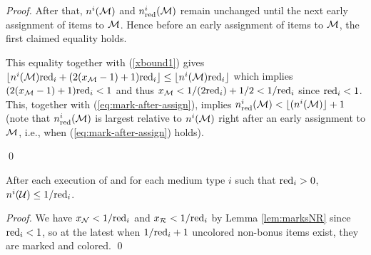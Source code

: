 \begin{proof}
After that, $\allitems(\M)$ and $\reditems(\M)$ remain unchanged until the next early assignment of items to $\mathcal{M}$. Hence before an early assignment of items to $\mathcal{M}$, the first claimed equality holds.

This equality together with (\ref{xbound1}) 
gives $\lfloor n^i(\mathcal{M})\mathrm{red}_i + (2(x_{\mathcal{M}}-1)+1)\mathrm{red}_i \rfloor \le \lfloor n^i(\mathcal{M})\mathrm{red}_i \rfloor$
which implies $(2(x_{\mathcal{M}}-1)+1)\mathrm{red}_i<1$ and thus $x_{\mathcal{M}} < 1/(2\mathrm{red}_i)+1/2 < 1/\mathrm{red}_i$ since $\mathrm{red}_i<1$.
This, together with (\ref{eq:mark-after-assign}), implies $n_{\mathrm{red}}^i(\mathcal{M})<\lfloor (n^i(\mathcal{M}) \rfloor +1$ (note that $\reditems(\M)$ is largest relative to $\allitems(\M)$ right after an early assignment to $\mathcal{M}$, i.e., when (\ref{eq:mark-after-assign}) holds).
\iffalse
It furthermore follows from (\ref{xbound2}) that after any early assignment
has taken place and the $x_\M$ bins with one blue item have received their
second blue item, we have 
\begin{equation}
\allitems(\M)\redfrac_i < \reditems(\M) +2\redfrac_i \label{lem1:before-assignment}
\end{equation}
since by this time $\allitems(\M)$ has increased by $2x_\M+1$ and
$\reditems(\M)$ has increased by 1 compared to the situation in (\ref{xbound2}).
This also holds before the first early assignment takes place.
By definition of $\blue_\M$, we have $(\allitems(\M)+2\blue_\M+1)\redfrac_i \ge \reditems(\M)+1$. This, together with (\ref{lem1:before-assignment}), implies
$(2\blue_\M+1)\redfrac_i > 1-2\redfrac_i$ and thus $\blue_\M > 1/(2\redfrac_i)-3/2$.
\fi 
\qed\end{proof}

\iffalse 
\begin{corollary}
	\label{cor}
	For a medium type $i$ with $\redfrac_i>0$, let $x_i = \max\{a\in\mathbb N| a <  1/(2\redfrac_i)+1/2 \}.$
	Then $\blue_\N\in\{x_i,x_i-1\}$ in all iterations of Algorithm \ref{alg:mark} for type $i$.
\end{corollary}
\begin{proof}
	By Lemma \ref{lem:marksNR}, $\blue_\N$ is strictly contained in an open interval of length 2.
\end{proof}
\fi 

\begin{corollary}
	\label{cor:uncolored}
	After each execution of \MarkItems{} and for each medium type  $i$ such that $\redfrac_i>0$, $n^i(\mathcal{U})\le 1/\mathrm{red}_i$.
\end{corollary}
\begin{proof}
	We have $x_{\mathcal{N}} < 1/\mathrm{red}_i$ and $x_{\mathcal{R}} < 1/\mathrm{red}_i$ by Lemma \ref{lem:marksNR}  since $\mathrm{red}_i<1$, so at the latest when
	$1/\mathrm{red}_i+1$ uncolored non-bonus items exist, they are marked and colored.
\qed\end{proof}





